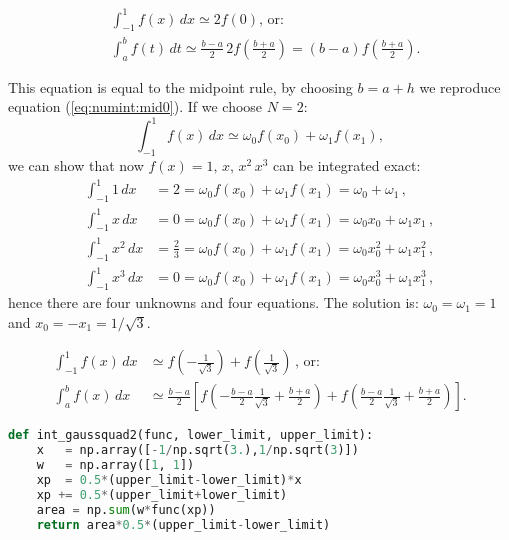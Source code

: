 \documentclass[graybox,sectrefs,envcountresetchap,open=right,final]{svmonodo}
\newenvironment{graybox2admon}[1][]{
\begin{graybox2mdframed}[frametitle=#1]
}
{
\end{graybox2mdframed}
}
\begin{document}
\begin{graybox2admon}[The Gaussian integration rule for $N=1$ is:]
\begin{align}
&\int_{-1}^{1}f(x)\,dx\simeq 2f(0)\text{, or: }\nonumber\\ 
&\int_{a}^{b}f(t)\,dt\simeq\frac{b-a}{2}\,2f(\frac{b+a}{2})=(b-a)f(\frac{b+a}{2}).
\end{align}
\end{graybox2admon}



This equation is equal to the midpoint rule, by choosing $b=a+h$ we reproduce equation (\ref{eq:numint:mid0}). If we choose $N=2$:
\begin{equation}
\int_{-1}^{1}f(x)\,dx\simeq\omega_0f(x_0)+\omega_1f(x_1),
\end{equation}
we can show that now $ f(x)=1,\,x,\,x^2\,x^3$ can be integrated exact:
\begin{align}
\int_{-1}^{1}1\,dx&=2=\omega_0f(x_0)+\omega_1f(x_1)=\omega_0+\omega_1\,,\\ 
\int_{-1}^{1}x\,dx&=0=\omega_0f(x_0)+\omega_1f(x_1)=\omega_0x_0+\omega_1x_1\,,\\ 
\int_{-1}^{1}x^2\,dx&=\frac{2}{3}=\omega_0f(x_0)+\omega_1f(x_1)=\omega_0x_0^2+\omega_1x_1^2\,,\\ 
\int_{-1}^{1}x^3\,dx&=0=\omega_0f(x_0)+\omega_1f(x_1)=\omega_0x_0^3+\omega_1x_1^3\,,
\end{align}
hence there are four unknowns and four equations. The solution is: $\omega_0=\omega_1=1$ and $x_0=-x_1=1/\sqrt{3}$.


\begin{graybox2admon}[The Gaussian integration rule for $N=2$ is:]
\begin{align}
\int_{-1}^{1}f(x)\,dx&\simeq f(-\frac{1}{\sqrt{3}})+f(\frac{1}{\sqrt{3}})\, \text{, or:}\\ 
\int_{a}^{b}f(x)\,dx&\simeq \frac{b-a}{2}\left[f(-\frac{b-a}{2}\frac{1}{\sqrt{3}}+\frac{b+a}{2})
+f(\frac{b-a}{2}\frac{1}{\sqrt{3}}+\frac{b+a}{2})\right].
\end{align}
\end{graybox2admon}



\begin{lstlisting}[language=Python,style=blue1]
def int_gaussquad2(func, lower_limit, upper_limit):
    x   = np.array([-1/np.sqrt(3.),1/np.sqrt(3)])
    w   = np.array([1, 1])
    xp  = 0.5*(upper_limit-lower_limit)*x
    xp += 0.5*(upper_limit+lower_limit)
    area = np.sum(w*func(xp))
    return area*0.5*(upper_limit-lower_limit)
\end{lstlisting}
\end{document}
